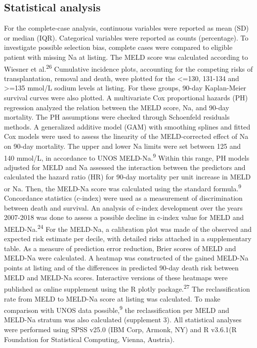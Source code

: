 \documentclass[11pt,english,]{book} %
\begin{document}
\hypertarget{statistical-analysis}{%
\subsection*{Statistical analysis}\label{statistical-analysis}}

For the complete-case analysis, continuous variables were reported as mean (SD) or median (IQR). Categorical variables were reported as counts (percentage). To investigate possible selection bias, complete cases were compared to eligible patient with missing Na at listing. The MELD score was calculated according to Wiesner et al.\textsuperscript{26} Cumulative incidence plots, accounting for the competing risks of transplantation, removal and death, were plotted for the \textless=130, 131-134 and \textgreater=135 mmol/L sodium levels at listing. For these groups, 90-day Kaplan-Meier survival curves were also plotted. A multivariate Cox proportional hazards (PH) regression analyzed the relation between the MELD score, Na, and 90-day mortality. The PH assumptions were checked through Schoenfeld residuals methods. A generalized additive model (GAM) with smoothing splines and fitted Cox models were used to assess the linearity of the MELD-corrected effect of Na on 90-day mortality. The upper and lower Na limits were set between 125 and 140 mmol/L, in accordance to UNOS MELD-Na.\textsuperscript{9} Within this range, PH models adjusted for MELD and Na assessed the interaction between the predictors and calculated the hazard ratio (HR) for 90-day mortality per unit increase in MELD or Na. Then, the MELD-Na score was calculated using the standard formula.\textsuperscript{9} Concordance statistics (c-index) were used as a measurement of discrimination between death and survival. An analysis of c-index development over the years 2007-2018 was done to assess a possible decline in c-index value for MELD and MELD-Na.\textsuperscript{24} For the MELD-Na, a calibration plot was made of the observed and expected risk estimate per decile, with detailed risks attached in a supplementary table. As a measure of prediction error reduction, Brier scores of MELD and MELD-Na were calculated. A heatmap was constructed of the gained MELD-Na points at listing and of the differences in predicted 90-day death risk between MELD and MELD-Na scores. Interactive versions of these heatmaps were published as online supplement using the R plotly package.\textsuperscript{27} The reclassification rate from MELD to MELD-Na score at listing was calculated. To make comparison with UNOS data possible,\textsuperscript{9} the reclassification per MELD and MELD-Na stratum was also calculated (supplement 3). All statistical analyses were performed using SPSS v25.0 (IBM Corp, Armonk, NY) and R v3.6.1(R Foundation for Statistical Computing, Vienna, Austria).
\end{document}
